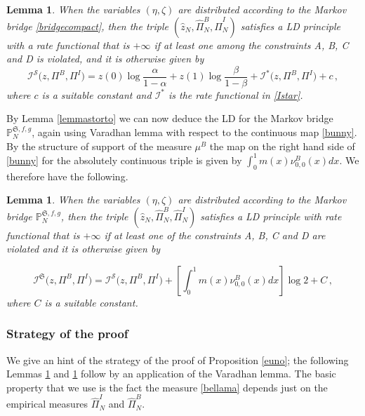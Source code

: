 \documentclass[reqno]{amsart}
\theoremstyle{plain}
\newtheorem{lemma}[theorem]{Lemma}
\theoremstyle{definition}
\theoremstyle{remark}
\numberwithin{equation}{section}
\numberwithin{theorem}{section}
\renewcommand{\hat}{\widehat}
\newcommand{\<}{\langle}
\renewcommand{\>}{\rangle}
\begin{document}
	\begin{lemma}\label{edue}
		When the variables $(\eta,\zeta)$ are distributed according to the Markov bridge \eqref{bridgecompact}, then the triple $\left(\hat z_N,\hat{\Pi}_N^B,\hat{\Pi}_N^I\right)$  satisfies a LD principle with a rate functional that is $+\infty$ if at least one among the constraints A, B, C and D is violated, and it is otherwise given by
		\begin{equation}
			\mathcal I^{\mathcal S}\Big(z,\Pi^B,\Pi^I\Big)=z(0)\log\frac{\alpha}{1-\alpha}+z(1)\log\frac{\beta}{1-\beta}+ \mathcal I^*\Big(z,\Pi^B,\Pi^I\Big)+c\,,
		\end{equation}
		where $c$ is a suitable constant and $\mathcal I^*$ is the rate functional in \eqref{Istar}.
	\end{lemma}
	
	
	By Lemma \ref{lemmastorto} we can now deduce the LD for the  Markov bridge $\mathbb P^{\mathfrak S, f,g}_{N}$, again using Varadhan lemma with respect to the continuous map \eqref{bunny}. By the structure of support of the measure $\mu^B$ the map on the right hand side of \eqref{bunny} for the absolutely continuous triple is given by $\int_0^1m(x)\nu^B_{0,0}(x)dx$. We therefore have the following.
	
	\begin{lemma}\label{etre}
		When the variables $(\eta,\zeta)$ are distributed according to the Markov bridge $\mathbb P^{\mathfrak S, f,g}_{N}$, then the triple $\left(\hat z_N,\hat{\Pi}_N^B,\hat{\Pi}_N^I\right)$ satisfies a LD principle with rate functional that is $+\infty$ if at least one of the constraints A, B, C and D are violated and it is otherwise given by
		
		\begin{equation}
			\mathcal I^{\mathfrak S}\Big(z,\Pi^B,\Pi^I\Big)=\mathcal I^{\mathcal S}\Big(z,\Pi^B,\Pi^I\Big)+ \left[\int_0^1m(x)\nu^B_{0,0}(x)dx\right]\log 2+C\,,
		\end{equation}
		where $C$ is a suitable constant.
	\end{lemma}
	
	\subsubsection{Strategy of the proof}
	We give an hint of the strategy of the proof of Proposition \ref{euno}; the following Lemmas \ref{edue} and \ref{etre} follow by an application of the Varadhan lemma.
	The basic property that we use is the fact the measure \eqref{bellama} depends just on the empirical measures $\hat \Pi^I_N$ and $\hat \Pi^B_N$.
	
\end{document}
